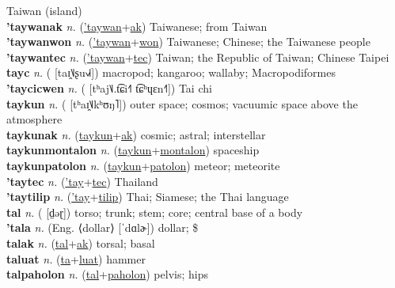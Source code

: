 Taiwan (island) \label{'taywan} \\
\textbf{'taywanak} \textit{n.} (\hyperref['taywan]{'taywan}+\hyperref[ak]{ak})
Taiwanese; from Taiwan \label{'taywanak} \\
\textbf{'taywanwon} \textit{n.} (\hyperref['taywan]{'taywan}+\hyperref[won]{won})
Taiwanese; Chinese; the Taiwanese people \label{'taywanwon} \\
\textbf{'taywantec} \textit{n.} (\hyperref['taywan]{'taywan}+\hyperref[tec]{tec})
Taiwan; the Republic of Taiwan; Chinese Taipei \label{'taywantec} \\
\textbf{tayc} \textit{n.} ( [taɪ̯˥˩ʂu˧˩˧])
macropod; kangaroo; wallaby; Macropodiformes \label{tayc} \\
\textbf{'taycicwen} \textit{n.} ( [tʰaj˥˩.t͡ɕi˧˥ t͡ɕʰɥɛn˧˥])
Tai chi \label{'taycicwen} \\
\textbf{taykun} \textit{n.} ( [tʰaɪ̯˥˩kʰʊŋ˥])
outer space; cosmos; vacuumic space above the atmosphere \label{taykun} \\
\textbf{taykunak} \textit{n.} (\hyperref[taykun]{taykun}+\hyperref[ak]{ak})
cosmic; astral; interstellar \label{taykunak} \\
\textbf{taykunmontalon} \textit{n.} (\hyperref[taykun]{taykun}+\hyperref[montalon]{montalon})
spaceship \label{taykunmontalon} \\
\textbf{taykunpatolon} \textit{n.} (\hyperref[taykun]{taykun}+\hyperref[patolon]{patolon})
meteor; meteorite \label{taykunpatolon} \\
\textbf{'taytec} \textit{n.} (\hyperref['tay]{'tay}+\hyperref[tec]{tec})
Thailand \label{'taytec} \\
\textbf{'taytilip} \textit{n.} (\hyperref['tay]{'tay}+\hyperref[tilip]{tilip})
Thai; Siamese; the Thai language \label{'taytilip} \\
\textbf{tal} \textit{n.} ( [d̤əɽ])
torso; trunk; stem; core; central base of a body \label{tal} \\
\textbf{'tala} \textit{n.} (Eng. ⟨dollar⟩ [ˈdɑlɚ])
dollar; \$ \label{'tala} \\
\textbf{talak} \textit{n.} (\hyperref[tal]{tal}+\hyperref[ak]{ak})
torsal; basal \label{talak} \\
\textbf{taluat} \textit{n.} (\hyperref[ta]{ta}+\hyperref[luat]{luat})
hammer \label{taluat} \\
\textbf{talpaholon} \textit{n.} (\hyperref[tal]{tal}+\hyperref[paholon]{paholon})
pelvis; hips \label{talpaholon} \\
